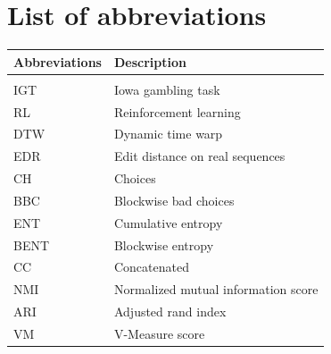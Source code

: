 \documentclass[12pt,a4paper,bibliography=totocnumbered,listof=totocnumbered]{scrartcl}
\begin{document}
\section{List of abbreviations}

\begin{tabular}{p{6cm}p{9cm}}
\textbf{Abbreviations} & \textbf{Description} 										\\
\midrule
\vspace{0.3cm} & \vspace{0.3cm} 														\\ 
IGT & Iowa gambling task \\
RL & Reinforcement learning \\
DTW & Dynamic time warp \\
EDR & Edit distance on real sequences \\
CH & Choices \\
BBC & Blockwise bad choices \\
ENT & Cumulative entropy \\
BENT & Blockwise entropy \\
CC & Concatenated \\
NMI & Normalized mutual information score \\
ARI & Adjusted rand index \\
VM & V-Measure score 
\end{tabular}

\newpage



\end{document}
